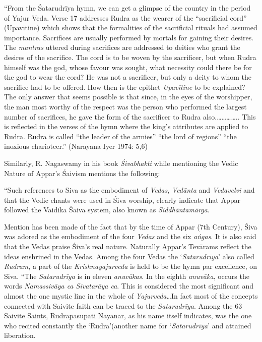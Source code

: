 \newpage

\begin{myquote}
“From the Śatarudrīya hymn, we can get a glimpse of the country in the period of Yajur Veda. Verse 17 addresses Rudra as the wearer of the “sacrificial cord” (Upavītine) which shows that the formalities of the sacrificial rituals had assumed importance. Sacrifices are usually performed by mortals for gaining their desires. The \textit{mantras} uttered during sacrifices are addressed to deities who grant the desires of the sacrifice. The cord is to be woven by the sacrificer, but when Rudra himself was the god, whose favour was sought, what necessity could there be for the god to wear the cord? He was not a sacrificer, but only a deity to whom the sacrifice had to be offered. How then is the epithet \textit{Upavītine} to be explained? The only answer that seems possible is that since, in the eyes of the worshipper, the man most worthy of the respect was the person who performed the largest number of sacrifices, he gave the form of the sacrificer to Rudra also.………….. This is reflected in the verses of the hymn where the king’s attributes are applied to Rudra. Rudra is called “the leader of the armies” “the lord of regions” “the inoxious charioteer.” (Narayana Iyer 1974: 5,6)
\end{myquote}

Similarly, R. Nagaswamy in his book \textit{Śivabhakti} while mentioning the Vedic Nature of Appar’s Śaivism mentions the following:

\begin{myquote}
“Such references to Siva as the embodiment of \textit{Vedas}, \textit{Vedānta} and \textit{Vedavelvi} and that the Vedic chants were used in Śiva worship, clearly indicate that Appar followed the Vaidika Śaiva system, also known as \textit{Siddhāntamārga}.
\end{myquote}

\begin{myquote}
Mention has been made of the fact that by the time of Appar (7th Century), Śiva was adored as the embodiment of the four \textit{Vedas} and the six \textit{ańgas}. It is also said that the Vedas praise Śiva’s real nature. Naturally Appar’s Tevārams reflect the ideas enshrined in the Vedas. Among the four Vedas the ‘\textit{Satarudrīya}’ also called \textit{Rudram}, a part of the \textit{Krishnayajurveda} is held to be the hymn par excellence, on Siva. “The \textit{Satarudrīya} is in eleven \textit{anuvākas}. In the eighth \textit{anuvāka}, occurs the words \textit{Namassivāya ca Sivatarāya ca}. This is considered the most significant and almost the one mystic line in the whole of \textit{Yajurveda}…In fact most of the concepts connected with Saivite faith can be traced to the \textit{Satarudrīya}. Among the 63 Saivite Saints, Rudrapasupati Nāyanār, as his name itself indicates, was the one who recited constantly the ‘Rudra’(another name for ‘\textit{Satarudrīya}’ and attained liberation.
\end{myquote}

